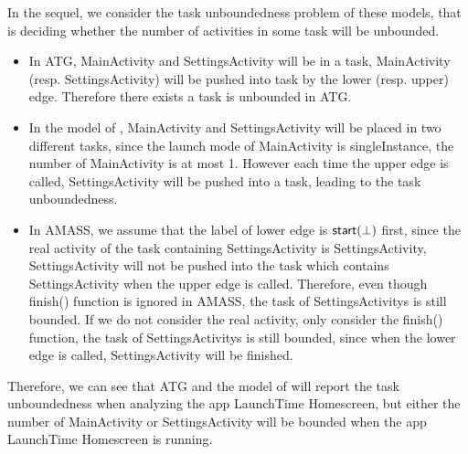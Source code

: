 {In the sequel, we consider the task unboundedness problem of these models, that is deciding whether the number of activities in some task will be unbounded. 
\begin{itemize}
	\item In ATG, MainActivity and SettingsActivity will be in a task, MainActivity (resp. SettingsActivity) will be pushed into task by the lower (resp. upper) edge. Therefore there exists a task is unbounded in ATG.
	\item In the model of \cite{LHR17}, MainActivity and SettingsActivity will be placed in two different tasks, since the launch mode of  MainActivity is singleInstance, the number of MainActivity is at most 1. However each time the upper edge is called, SettingsActivity will be pushed into a task, leading to the task unboundedness.
	\item In AMASS, we assume that the label of lower edge is ${\mathsf{start} }(\bot)$ first, since the real activity of the task containing SettingsActivity is SettingsActivity, SettingsActivity will not be pushed into the task which contains SettingsActivity when the upper edge is called. Therefore, even though finish() function is ignored in AMASS, the task of SettingsActivitys is still bounded. If we do not consider the real activity, only consider the finish() function, the task of SettingsActivitys is still bounded, since when the lower edge is called, SettingsActivity will be finished.
\end{itemize}
Therefore, we can see that ATG and the model of \cite{LHR17} will report the task unboundedness when analyzing the app LaunchTime Homescreen, but either the number of MainActivity or SettingsActivity will be bounded when the app LaunchTime Homescreen is running.
}

%
